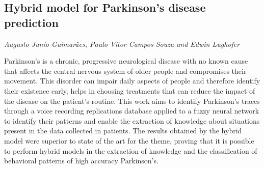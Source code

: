 \documentclass[../booklet.tex]{subfiles}
\begin{document}
\subsection[Hybrid model for Parkinson's disease prediction. {\it Augusto Junio Guimarães, Paulo Vitor Campos Souza and Edwin Lughofer}]{Hybrid model for Parkinson's disease prediction}
  

\begin{center}
  {\it Augusto Junio Guimarães, Paulo Vitor Campos Souza and Edwin Lughofer}
\end{center}

\vskip 0.8cm


Parkinson's is a chronic, progressive neurological disease with no known cause that affects the central nervous system of older people and compromises their movement. This disorder can impair daily aspects of people and therefore identify their existence early, helps in choosing treatments that can reduce the impact of the disease on the patient's routine. This work aims to identify Parkinson's traces through a voice recording replications database applied to a fuzzy neural network to identify their patterns and enable the extraction of knowledge about situations present in the data collected in patients. The results obtained by the hybrid model were superior to state of the art for the theme, proving that it is possible to perform hybrid models in the extraction of knowledge and the classification of behavioral patterns of high accuracy Parkinson's.

\end{document}

